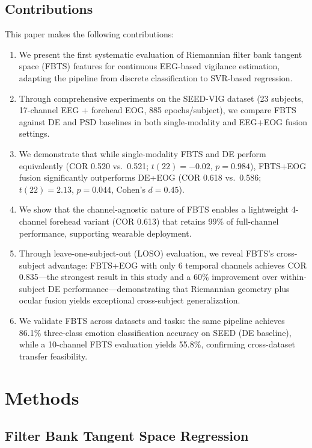 \documentclass{iopjournal}
\begin{document}
\subsection{Contributions}

This paper makes the following contributions:

\begin{enumerate}
  \item We present the first systematic evaluation of Riemannian filter bank tangent space (FBTS) features for continuous EEG-based vigilance estimation, adapting the pipeline from discrete classification to SVR-based regression.
  \item Through comprehensive experiments on the SEED-VIG dataset (23 subjects, 17-channel EEG + forehead EOG, 885 epochs/subject), we compare FBTS against DE and PSD baselines in both single-modality and EEG+EOG fusion settings.
  \item We demonstrate that while single-modality FBTS and DE perform equivalently (COR 0.520 vs.\ 0.521; $t(22)=-0.02$, $p=0.984$), FBTS+EOG fusion significantly outperforms DE+EOG (COR 0.618 vs.\ 0.586; $t(22)=2.13$, $p=0.044$, Cohen's $d=0.45$).
  \item We show that the channel-agnostic nature of FBTS enables a lightweight 4-channel forehead variant (COR 0.613) that retains 99\% of full-channel performance, supporting wearable deployment.
  \item Through leave-one-subject-out (LOSO) evaluation, we reveal FBTS's cross-subject advantage: FBTS+EOG with only 6 temporal channels achieves COR 0.835---the strongest result in this study and a 60\% improvement over within-subject DE performance---demonstrating that Riemannian geometry plus ocular fusion yields exceptional cross-subject generalization.
  \item We validate FBTS across datasets and tasks: the same pipeline achieves 86.1\% three-class emotion classification accuracy on SEED (DE baseline), while a 10-channel FBTS evaluation yields 55.8\%, confirming cross-dataset transfer feasibility.
\end{enumerate}

\section{Methods}

\subsection{Filter Bank Tangent Space Regression}
\end{document}
